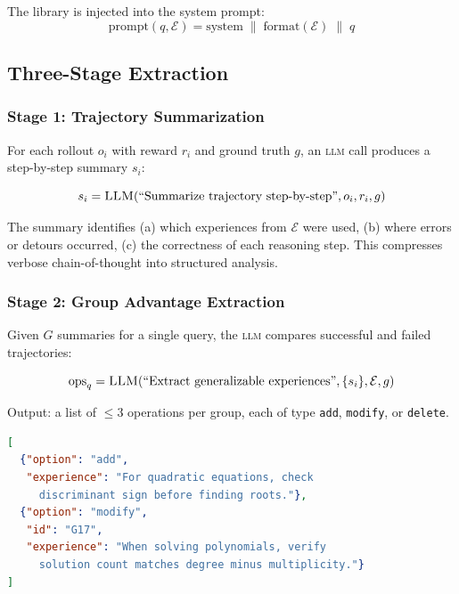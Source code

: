 \documentclass[11pt,letterpaper]{article}
\newcommand{\LLM}{\textsc{llm}}
\begin{document}
The library is injected into the system prompt:
\begin{equation}
    \text{prompt}(q, \mathcal{E}) = \text{system} \;\|\; \text{format}(\mathcal{E}) \;\|\; q
\end{equation}

\subsection{Three-Stage Extraction}

\subsubsection{Stage 1: Trajectory Summarization}

For each rollout $o_i$ with reward $r_i$ and ground truth $g$, an \LLM{} call produces a step-by-step summary $s_i$:

\begin{equation}
    s_i = \textsc{LLM}\!\left(\text{``Summarize trajectory step-by-step''}, o_i, r_i, g\right)
\end{equation}

The summary identifies (a) which experiences from $\mathcal{E}$ were used, (b) where errors or detours occurred, (c) the correctness of each reasoning step.  This compresses verbose chain-of-thought into structured analysis.

\subsubsection{Stage 2: Group Advantage Extraction}

Given $G$ summaries for a single query, the \LLM{} compares successful and failed trajectories:

\begin{equation}
    \text{ops}_q = \textsc{LLM}\!\left(\text{``Extract generalizable experiences''}, \{s_i\}, \mathcal{E}, g\right)
\end{equation}

Output: a list of $\leq$3 operations per group, each of type \texttt{add}, \texttt{modify}, or \texttt{delete}.

\begin{lstlisting}[language=JSON,caption=Stage 2 output example]
[
  {"option": "add",
   "experience": "For quadratic equations, check
     discriminant sign before finding roots."},
  {"option": "modify",
   "id": "G17",
   "experience": "When solving polynomials, verify
     solution count matches degree minus multiplicity."}
]
\end{lstlisting}
\end{document}
